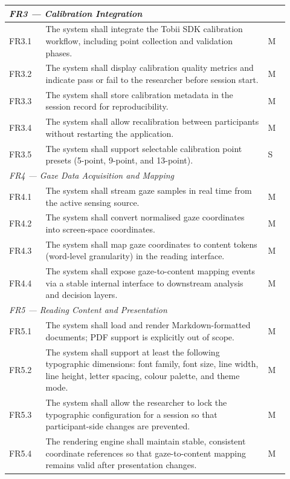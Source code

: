 \begin{longtable}{%
  p{0.12\linewidth}
  p{0.73\linewidth}
  p{0.07\linewidth}
}
\multicolumn{3}{l}{\textit{FR3 — Calibration Integration}} \\
\midrule
FR3.1 & The system shall integrate the Tobii SDK calibration workflow,
        including point collection and validation phases. & M \\
FR3.2 & The system shall display calibration quality metrics and indicate
        pass or fail to the researcher before session start. & M \\
FR3.3 & The system shall store calibration metadata in the session record for
        reproducibility. & M \\
FR3.4 & The system shall allow recalibration between participants without
        restarting the application. & M \\
FR3.5 & The system shall support selectable calibration point presets
        (5-point, 9-point, and 13-point). & S \\
\midrule

\multicolumn{3}{l}{\textit{FR4 — Gaze Data Acquisition and Mapping}} \\
\midrule
FR4.1 & The system shall stream gaze samples in real time from the active
        sensing source. & M \\
FR4.2 & The system shall convert normalised gaze coordinates into screen-space
        coordinates. & M \\
FR4.3 & The system shall map gaze coordinates to content tokens
        (word-level granularity) in the reading interface. & M \\
FR4.4 & The system shall expose gaze-to-content mapping events via a stable
        internal interface to downstream analysis and decision layers. & M \\
\midrule

\multicolumn{3}{l}{\textit{FR5 — Reading Content and Presentation}} \\
\midrule
FR5.1 & The system shall load and render Markdown-formatted documents;
        PDF support is explicitly out of scope. & M \\
FR5.2 & The system shall support at least the following typographic
        dimensions: font family, font size, line width, line height,
        letter spacing, colour palette, and theme mode. & M \\
FR5.3 & The system shall allow the researcher to lock the typographic
        configuration for a session so that participant-side changes
        are prevented. & M \\
FR5.4 & The rendering engine shall maintain stable, consistent coordinate
        references so that gaze-to-content mapping remains valid after
        presentation changes. & M \\
\midrule


\end{longtable}
